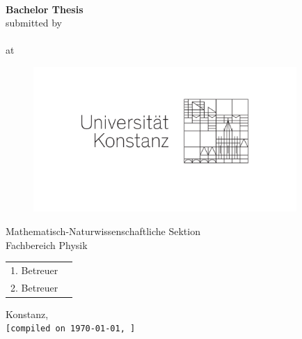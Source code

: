 

\begin{titlepage}
	\begin{center}
	
		{\LARGE\textbf{\BAtitle}}
		\vspace{12ex} \\
		{\LARGE\textbf{Bachelor Thesis}}
		\vspace{8ex}\\
		
		{\Large{submitted by}}
		\vspace{0ex}\\
		{\Large\textbf{\BAauthor}}
		\vspace{8ex}\\
		
		at\\
		\begin{figure}[htpb]
		\centering
		\includegraphics[width=10cm]{Titelseite/Universitaetslogo.pdf}
		\end{figure}
		
		Mathematisch-Naturwissenschaftliche Sektion\\
		Fachbereich Physik
		\vspace{8ex}\\
		
		\begin{table}[h]
		\centering
		
		\begin{tabular}{ll}
		1. Betreuer & \BAreaderone \\
		2. Betreuer & \BAreadertwo \\
		\end{tabular}
		\end{table}
		
		\vfill
		Konstanz, \BAyear \\
		\texttt{[compiled on \today, \currenttime]}
	\end{center}
\end{titlepage}
\pagestyle{empty}


\newpage

